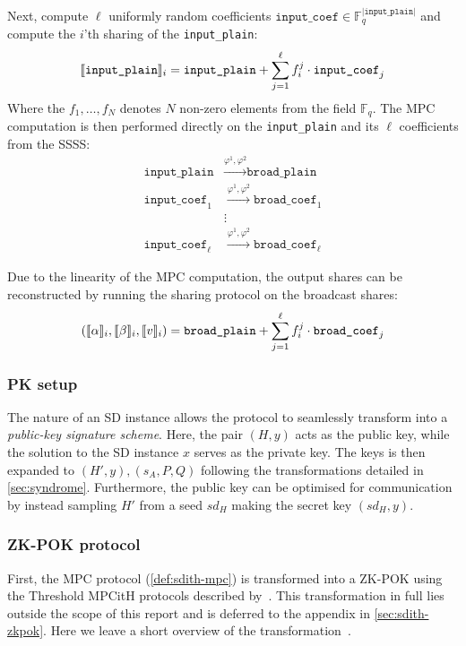 \documentclass[11pt]{report}
\theoremstyle{definition}
\theoremstyle{plain}
\begin{document}
Next, compute $\ell$ uniformly random coefficients $\texttt{input\_coef} \in \mathbb{F}_q^{|\texttt{input\_plain}|}$ and compute the $i$'th sharing of the \texttt{input\_plain}:
\begin{align}\label{equation:input_sharing}
  \llbracket \texttt{input\_plain} \rrbracket_i = \texttt{input\_plain} + \sum_{j=1}^\ell f_i^j \cdot \texttt{input\_coef}_j
\end{align}
Where the $f_1,\dots,f_N$ denotes $N$ non-zero elements from the field $\mathbb{F}_q$.
The MPC computation is then performed directly on the \texttt{input\_plain} and its $\ell$ coefficients from the SSSS:
\begin{align*}
  \texttt{input\_plain}     & \stackrel{\varphi^1, \varphi^2}{\longrightarrow} \texttt{broad\_plain}     \\
  \texttt{input\_coef}_1    & \stackrel{\varphi^1, \varphi^2}{\longrightarrow} \texttt{broad\_coef}_1    \\
                            & \vdots                                                                     \\
  \texttt{input\_coef}_\ell & \stackrel{\varphi^1, \varphi^2}{\longrightarrow} \texttt{broad\_coef}_\ell
\end{align*}

Due to the linearity of the MPC computation, the output shares can be reconstructed by running the sharing protocol on the broadcast shares:
\begin{align}\label{equation:input_sharing_reverse}
  (\llbracket \alpha \rrbracket_i, \llbracket \beta \rrbracket_i, \llbracket v \rrbracket_i) = \texttt{broad\_plain} + \sum_{j=1}^\ell f_i^j \cdot \texttt{broad\_coef}_j
\end{align}

\subsubsection{PK setup}
The nature of an SD instance allows the protocol to seamlessly transform into a \textit{public-key signature scheme}. Here, the pair $(H, y)$ acts as the public key, while the solution to the SD instance $x$ serves as the private key. The keys is then expanded to $(H', y), (s_A, P, Q)$ following the transformations detailed in \autoref{sec:syndrome}. Furthermore, the public key can be optimised for communication by instead sampling $H'$ from a seed $sd_H$ making the secret key $(sd_H, y)$.

\subsubsection{ZK-POK protocol}
First, the MPC protocol (\autoref{def:sdith-mpc}) is transformed into a ZK-POK using the Threshold MPCitH protocols described by~\cite{feneuil2023threshold,feneuil2023threshold2}. This transformation in full lies outside the scope of this report and is deferred to the appendix in \autoref{sec:sdith-zkpok}. Here we leave a short overview of the transformation~\cite{aguilarsyndrome11}.
\end{document}

